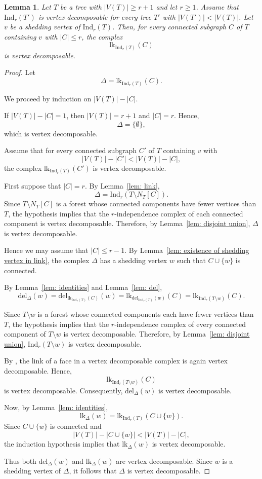 \documentclass[12pt,reqno]{amsart}
\newtheorem{lemma}[theorem]{Lemma}
\theoremstyle{definition}
\def\Ind{\mathrm{Ind}}
\def\del{\mathrm{del}}
\def\lk{\mathrm{lk}}
\begin{document}
\begin{lemma}\label{lem: shedding vertex for the particular link}
Let $T$ be a tree with $|V(T)| \ge r+1$ and let $r \ge 1$. Assume that $\Ind_r(T')$ is vertex decomposable for every tree $T'$ with $|V(T')|<|V(T)|$. Let $v$ be a shedding vertex of $\Ind_r(T)$. Then, for every connected subgraph $C$ of $T$ containing $v$ with $|C|\le r$, the complex
\[
\lk_{\Ind_r(T)}(C)
\]
is vertex decomposable.
\end{lemma}

\begin{proof}
Let
\[
\Delta=\lk_{\Ind_r(T)}(C).
\]

We proceed by induction on $|V(T)|-|C|$.

If $|V(T)|-|C|=1$, then $|V(T)|=r+1$ and $|C|=r$. Hence,
\[
\Delta=\{\emptyset\},
\]
which is vertex decomposable.

Assume that for every connected subgraph $C'$ of $T$ containing $v$ with
\[
|V(T)|-|C'|<|V(T)|-|C|,
\]
the complex $\lk_{\Ind_r(T)}(C')$ is vertex decomposable.

First suppose that $|C|=r$. By Lemma~\ref{lem: link},
\[
\Delta=\Ind_r(T\setminus N_T[C]).
\]
Since $T\setminus N_T[C]$ is a forest whose connected components have fewer vertices than $T$, the hypothesis implies that the $r$-independence complex of each connected component is vertex decomposable. Therefore, by Lemma~\ref{lem: disjoint union}, $\Delta$ is vertex decomposable.

Hence we may assume that $|C|\le r-1$. By Lemma~\ref{lem: existence of shedding vertex in link}, the complex $\Delta$ has a shedding vertex $w$ such that $C\cup\{w\}$ is connected.

By Lemma~\ref{lem: identities} and Lemma~\ref{lem: del},
\[
\del_\Delta(w)
=
\del_{\lk_{\Ind_r(T)}(C)}(w)
=
\lk_{\del_{\Ind_r(T)}(w)}(C)
=
\lk_{\Ind_r(T\setminus w)}(C).
\]

Since $T\setminus w$ is a forest whose connected components each have fewer vertices than $T$, the hypothesis implies that the $r$-independence complex of every connected component of $T\setminus w$ is vertex decomposable. Therefore, by Lemma~\ref{lem: disjoint union}, $\Ind_r(T\setminus w)$ is vertex decomposable.

By \cite[Theorem 3.30]{JJonsson08}, the link of a face in a vertex decomposable complex is again vertex decomposable. Hence,
\[
\lk_{\Ind_r(T\setminus w)}(C)
\]
is vertex decomposable. Consequently, $\del_\Delta(w)$ is vertex decomposable.

Now, by Lemma~\ref{lem: identities},
\[
\lk_\Delta(w)
=
\lk_{\Ind_r(T)}(C\cup\{w\}).
\]
Since $C\cup\{w\}$ is connected and
\[
|V(T)|-|C\cup\{w\}|
<
|V(T)|-|C|,
\]
the induction hypothesis implies that $\lk_\Delta(w)$ is vertex decomposable.

Thus both $\del_\Delta(w)$ and $\lk_\Delta(w)$ are vertex decomposable. Since $w$ is a shedding vertex of $\Delta$, it follows that $\Delta$ is vertex decomposable.
\end{proof}
\end{document}
